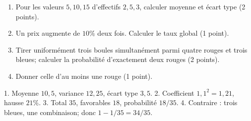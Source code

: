 \label{t11s-syn2-e03}
\begin{enumerate}\item Pour les valeurs $5,10,15$ d’effectifs $2,5,3$, calculer moyenne et écart type (2 points).
\item Un prix augmente de $10\%$ deux fois. Calculer le taux global (1 point).
\item Tirer uniformément trois boules simultanément parmi quatre rouges et trois bleues; calculer la probabilité d’exactement deux rouges (2 points).
\item Donner celle d’au moins une rouge (1 point).\end{enumerate}
\begin{corrige}\label{sol-t11s-syn2-e03}
1. Moyenne $10{,}5$, variance $12{,}25$, écart type $3{,}5$.
2. Coefficient $1{,}1^2=1{,}21$, hausse $21\%$.
3. Total $35$, favorables $18$, probabilité $18/35$.
4. Contraire : trois bleues, une combinaison; donc $1-1/35=34/35$.
\end{corrige}
\endgroup
